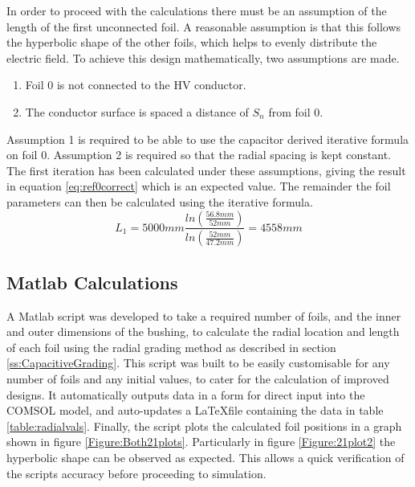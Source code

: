 In order to proceed with the calculations there must be an assumption of the length of the first unconnected foil.
A reasonable assumption is that this follows the hyperbolic shape of the other foils, which helps to evenly distribute the electric field.
To achieve this design mathematically, two assumptions are made.
\begin{enumerate}
\item Foil 0 is not connected to the HV conductor.
\item The conductor surface is spaced a distance of $S_n$ from foil 0.
\end{enumerate}
Assumption 1 is required to be able to use the capacitor derived iterative formula on foil 0.
Assumption 2 is required so that the radial spacing is kept constant.
The first iteration has been calculated under these assumptions, giving the result in equation \ref{eq:ref0correct} which is an expected value.
The remainder the foil parameters can then be calculated using the iterative formula.
\begin{equation}
   \label{eq:ref0correct}
   L_{1}
   = 5000mm\displaystyle\frac{{ln(\displaystyle\frac{56.8mm}{52mm})} }{ln(\displaystyle\frac{52mm}{47.2mm})}
   = 4558mm
\end{equation}

\subsection{Matlab Calculations}
A Matlab script was developed to take a required number of foils, and the inner and outer dimensions of the bushing, to calculate the radial location and length of each foil using the radial grading method as described in section \ref{ss:CapacitiveGrading}.
This script was built to be easily customisable for any number of foils and any initial values, to cater for the calculation of improved designs.
It automatically outputs data in a form for direct input into the COMSOL model, and auto-updates a \LaTeX  file containing the data in table \ref{table:radialvals}.
Finally, the script plots the calculated foil positions in a graph shown in figure \ref{Figure:Both21plots}.
Particularly in figure \ref{Figure:21plot2} the hyperbolic shape can be observed as expected.
This allows a quick verification of the scripts accuracy before proceeding to simulation.



